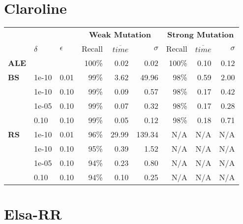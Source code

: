 \section{Claroline}

\begin{small} 
\begin{tabular}{lll|r|r|r|r|r|r} 
 & & & \multicolumn{3}{c|}{\textbf{Weak Mutation}} & \multicolumn{3}{c}{\textbf{Strong Mutation}}\\ 
 & $\delta$ & $\epsilon$ & Recall & $\overline{time}$ & $\sigma$ & Recall & $\overline{time}$ & $\sigma$ \\  
\hline 
\textbf{ALE} & & & 100\% & 0.02  & 0.02  & 100\% & 0.10  & 0.12  \\ 
\textbf{BS}  & 1e-10  & 0.01  & 99\% & 3.62  & 49.96  & 98\% & 0.59  & 2.00\\
 & 1e-10  & 0.10  & 99\% & 0.09  & 0.57  & 98\% & 0.17  & 0.42\\
 & 1e-05  & 0.10  & 99\% & 0.07  & 0.32  & 98\% & 0.17  & 0.28\\
 & 0.10  & 0.10  & 99\% & 0.05  & 0.12  & 98\% & 0.18  & 0.71\\
\textbf{RS}  & 1e-10  & 0.01  & 96\% & 29.99  & 139.34 & N/A & N/A & N/A \\
 & 1e-10  & 0.10  & 95\% & 0.39  & 1.52 & N/A & N/A & N/A \\
 & 1e-05  & 0.10  & 94\% & 0.23  & 0.80 & N/A & N/A & N/A \\
 & 0.10  & 0.10  & 94\% & 0.10  & 0.25 & N/A & N/A & N/A \\
\end{tabular} 
\end{small}


\section{Elsa-RR}

